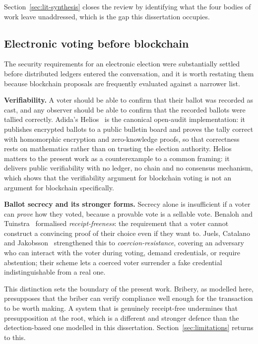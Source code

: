 Section~\ref{sec:lit-synthesis} closes the review by identifying what
the four bodies of work leave unaddressed, which is the gap this
dissertation occupies.

\subsection{Electronic voting before blockchain}
\label{sec:lit-evoting}

The security requirements for an electronic election were substantially
settled before distributed ledgers entered the conversation, and it is
worth restating them because blockchain proposals are frequently
evaluated against a narrower list.

\textbf{Verifiability.} A voter should be able to confirm that their
ballot was recorded as cast, and any observer should be able to confirm
that the recorded ballots were tallied correctly. Adida's
Helios~\cite{adida2008} is the canonical open-audit implementation: it
publishes encrypted ballots to a public bulletin board and proves the
tally correct with homomorphic encryption and zero-knowledge proofs, so
that correctness rests on mathematics rather than on trusting the
election authority. Helios matters to the present work as a
counterexample to a common framing: it delivers public verifiability
with no ledger, no chain and no consensus mechanism, which shows that
the verifiability argument for blockchain voting is not an argument for
blockchain specifically.

\textbf{Ballot secrecy and its stronger forms.} Secrecy alone is
insufficient if a voter can \emph{prove} how they voted, because a
provable vote is a sellable vote. Benaloh and
Tuinstra~\cite{benaloh1994} formalised \emph{receipt-freeness}: the
requirement that a voter cannot construct a convincing proof of their
choice even if they want to. Juels, Catalano and
Jakobsson~\cite{juels2005} strengthened this to
\emph{coercion-resistance}, covering an adversary who can interact with
the voter during voting, demand credentials, or require abstention;
their scheme lets a coerced voter surrender a fake credential
indistinguishable from a real one.

This distinction sets the boundary of the present work. Bribery, as
modelled here, presupposes that the briber can verify compliance well
enough for the transaction to be worth making. A system that is
genuinely receipt-free undermines that presupposition at the root,
which is a different and stronger defence than the detection-based one
modelled in this dissertation. Section~\ref{sec:limitations} returns to
this.

